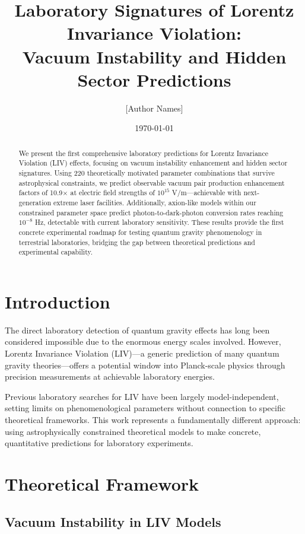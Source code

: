 \documentclass[12pt]{article}
\title{Laboratory Signatures of Lorentz Invariance Violation: \\ Vacuum Instability and Hidden Sector Predictions}
\author{[Author Names]}
\date{\today}
\begin{document}
\maketitle

\begin{abstract}
We present the first comprehensive laboratory predictions for Lorentz Invariance Violation (LIV) effects, focusing on vacuum instability enhancement and hidden sector signatures. Using 220 theoretically motivated parameter combinations that survive astrophysical constraints, we predict observable vacuum pair production enhancement factors of 10.9$\times$ at electric field strengths of $10^{15}$ V/m—achievable with next-generation extreme laser facilities. Additionally, axion-like models within our constrained parameter space predict photon-to-dark-photon conversion rates reaching $10^{-8}$ Hz, detectable with current laboratory sensitivity. These results provide the first concrete experimental roadmap for testing quantum gravity phenomenology in terrestrial laboratories, bridging the gap between theoretical predictions and experimental capability.
\end{abstract}

\section{Introduction}

The direct laboratory detection of quantum gravity effects has long been considered impossible due to the enormous energy scales involved. However, Lorentz Invariance Violation (LIV)—a generic prediction of many quantum gravity theories—offers a potential window into Planck-scale physics through precision measurements at achievable laboratory energies.

Previous laboratory searches for LIV have been largely model-independent, setting limits on phenomenological parameters without connection to specific theoretical frameworks. This work represents a fundamentally different approach: using astrophysically constrained theoretical models to make concrete, quantitative predictions for laboratory experiments.

\section{Theoretical Framework}

\subsection{Vacuum Instability in LIV Models}
\end{document}
